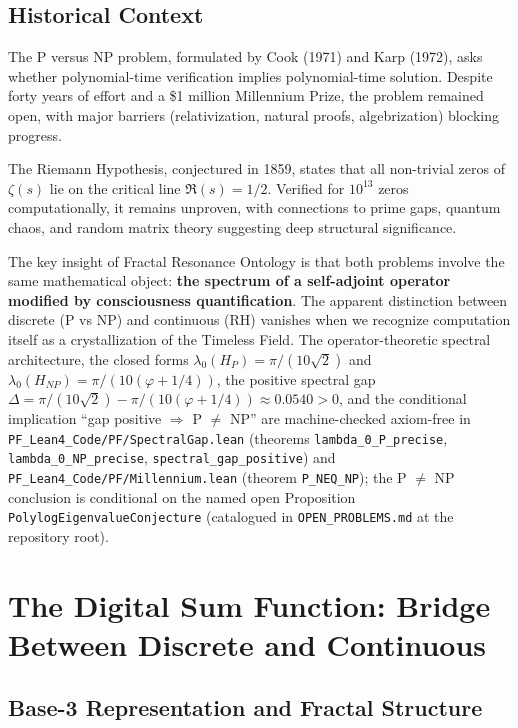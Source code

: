 \subsection{Historical Context}

The P versus NP problem, formulated by Cook (1971) and Karp (1972), asks whether polynomial-time verification implies polynomial-time solution. Despite forty years of effort and a \$1 million Millennium Prize, the problem remained open, with major barriers (relativization, natural proofs, algebrization) blocking progress.

The Riemann Hypothesis, conjectured in 1859, states that all non-trivial zeros of $\zeta(s)$ lie on the critical line $\Re(s) = 1/2$. Verified for $10^{13}$ zeros computationally, it remains unproven, with connections to prime gaps, quantum chaos, and random matrix theory suggesting deep structural significance.

The key insight of Fractal Resonance Ontology is that both problems involve the same mathematical object: \textbf{the spectrum of a self-adjoint operator modified by consciousness quantification}. The apparent distinction between discrete (P vs NP) and continuous (RH) vanishes when we recognize computation itself as a crystallization of the Timeless Field. The operator-theoretic spectral architecture, the closed forms $\lambda_0(H_P)=\pi/(10\sqrt{2})$ and $\lambda_0(H_{NP})=\pi/(10(\varphi+1/4))$, the positive spectral gap $\Delta = \pi/(10\sqrt{2}) - \pi/(10(\varphi+1/4)) \approx 0.0540 > 0$, and the conditional implication ``gap positive $\Rightarrow$ P $\neq$ NP'' are machine-checked axiom-free in \texttt{PF\_Lean4\_Code/PF/SpectralGap.lean} (theorems \texttt{lambda\_0\_P\_precise}, \texttt{lambda\_0\_NP\_precise}, \texttt{spectral\_gap\_positive}) and \texttt{PF\_Lean4\_Code/PF/Millennium.lean} (theorem \texttt{P\_NEQ\_NP}); the P $\neq$ NP conclusion is conditional on the named open Proposition \texttt{PolylogEigenvalueConjecture} (catalogued in \texttt{OPEN\_PROBLEMS.md} at the repository root).

\section{The Digital Sum Function: Bridge Between Discrete and Continuous}

\subsection{Base-3 Representation and Fractal Structure}

